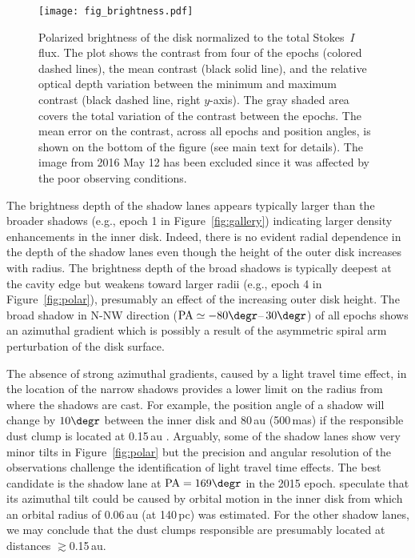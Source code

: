 \documentclass[twocolumn,tighten]{aastex61}
\begin{document}
\begin{figure*}
\centering
\texttt{[image: fig\_brightness.pdf]}
\caption{Polarized brightness of the disk normalized to the total Stokes~$I$ flux. The plot shows the contrast from four of the epochs (colored dashed lines), the mean contrast (black solid line), and the relative optical depth variation between the minimum and maximum contrast (black dashed line, right $y$-axis). The gray shaded area covers the total variation of the contrast between the epochs. The mean error on the contrast, across all epochs and position angles, is shown on the bottom of the figure (see main text for details). The image from 2016 May 12 has been excluded since it was affected by the poor observing conditions.\label{fig:brightness}}
\end{figure*}

The brightness depth of the shadow lanes appears typically larger than the broader shadows (e.g., epoch 1 in Figure~\ref{fig:gallery}) indicating larger density enhancements in the inner disk. Indeed, there is no evident radial dependence in the depth of the shadow lanes even though the height of the outer disk increases with radius. The brightness depth of the broad shadows is typically deepest at the cavity edge but weakens toward larger radii (e.g., epoch 4 in Figure~\ref{fig:polar}), presumably an effect of the increasing outer disk height. The broad shadow in N-NW direction (${\rm PA} \simeq -80\degr$--\,$30\degr$) of all epochs shows an azimuthal gradient which is possibly a result of the asymmetric spiral arm perturbation of the disk surface.

The absence of strong azimuthal gradients, caused by a light travel time effect, in the location of the narrow shadows provides a lower limit on the radius from where the shadows are cast. For example, the position angle of a shadow will change by $10\degr$ between the inner disk and 80\,au (500\,mas) if the responsible dust clump is located at 0.15\,au \citep[see also][]{kama2016}. Arguably, some of the shadow lanes show very minor tilts in Figure~\ref{fig:polar} but the precision and angular resolution of the observations challenge the identification of light travel time effects. The best candidate is the shadow lane at ${\rm PA} = 169\degr$ in the 2015 epoch. \citet{stolker2016} speculate that its azimuthal tilt could be caused by orbital motion in the inner disk from which an orbital radius of 0.06\,au (at 140\,pc) was estimated. For the other shadow lanes, we may conclude that the dust clumps responsible are presumably located at distances $\gtrsim$0.15\,au.
\end{document}
